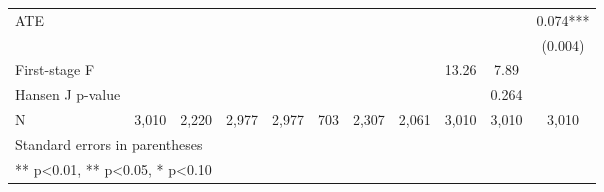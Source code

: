 \begin{table}[htbp]
\begin{tabular}{lcccccccccc}
ATE &  &  &  &  &  &  &  &  &  & 0.074*** \\
 &  &  &  &  &  &  &  &  &  & (0.004) \\
\hline
First-stage F &  &  &  &  &  &  &  & 13.26 & 7.89 &  \\
Hansen J p-value &  &  &  &  &  &  &  &  & 0.264 &  \\
\hline
N & 3,010 & 2,220 & 2,977 & 2,977 & 703 & 2,307 & 2,061 & 3,010 & 3,010 & 3,010 \\
\hline\hline
\multicolumn{11}{l}{\footnotesize Standard errors in parentheses} \\
\multicolumn{11}{l}{\footnotesize *** p<0.01, ** p<0.05, * p<0.10} \\
\end{tabular}
\end{table}